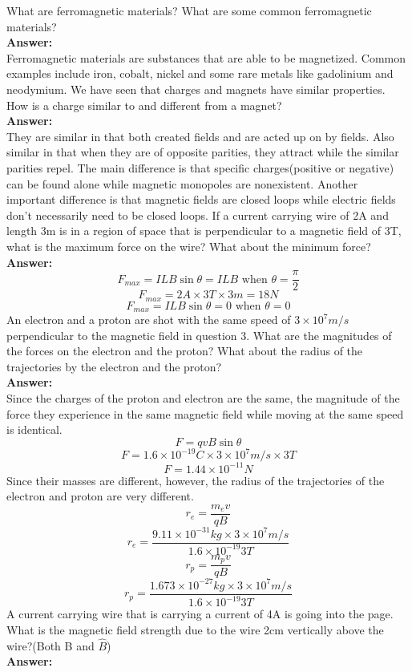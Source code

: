 \documentclass[9pt,addpoints]{exam}
\begin{document}
	\begin{questions}
		\question What are ferromagnetic materials? What are some common ferromagnetic materials? \\ \textbf{Answer:} \\
		Ferromagnetic materials are substances that are able to be magnetized. Common examples include iron, cobalt, nickel and some rare metals like gadolinium and neodymium.
		\question We have seen that charges and magnets have similar properties. How is a charge similar to and different from a magnet?\\ \textbf{Answer:} \\
		They are similar in that both created fields and are acted up on by fields. Also similar in that when they are of opposite parities, they attract while the similar parities repel. The main difference is that specific charges(positive or negative) can be found alone while magnetic monopoles are nonexistent. Another important difference is that magnetic fields are closed loops while electric fields don't necessarily need to be closed loops.
		\question If a current carrying wire of 2A and length 3m is in a region of space that is perpendicular to a magnetic field of 3T, what is the maximum force on the wire? What about the minimum force?\\ \textbf{Answer:} \\
		$$F_{max}=ILB\sin\theta=ILB\text{  when }\theta=\dfrac{\pi}{2}$$
		$$F_{max}=2A\times3T\times3m=18N$$
		$$F_{max}=ILB\sin\theta=0\text{  when }\theta=0$$
		\question An electron and a proton are shot with the same speed of $3\times10^7m/s$ perpendicular to the magnetic field in question 3. What are the magnitudes of the forces on the electron and the proton? What about the radius of the trajectories by the electron and the proton?\\ \textbf{Answer:} \\
		Since the charges of the proton and electron are the same, the magnitude of the force they experience in the same magnetic field while moving at the same speed is identical.
		$$F=qvB\sin\theta$$
		$$F=1.6\times10^{-19}C\times3\times10^7m/s\times3T$$
		$$F=1.44\times10^{-11}N$$
		Since their masses are different, however, the radius of the trajectories of the electron and proton are very different.
		$$r_e=\dfrac{m_ev}{qB}$$
		$$r_e=\dfrac{9.11\times10^{-31}kg\times3\times10^7m/s}{1.6\times10^{-19}3T}$$
		$$r_p=\dfrac{m_pv}{qB}$$
		$$r_p=\dfrac{1.673\times10^{-27}kg\times3\times10^7m/s}{1.6\times10^{-19}3T}$$
		\question A current carrying wire that is carrying a current of 4A is going into the page. What is the magnetic field strength due to the wire 2cm vertically above the wire?(Both B and $\hat{B}$)\\ \textbf{Answer:} \\

\end{questions}
\end{document}
